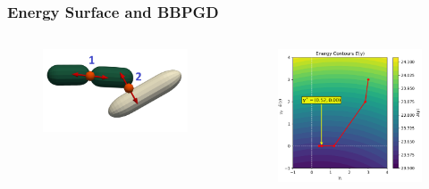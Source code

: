 \documentclass[10pt,t]{beamer}
\begin{document}
\begin{frame}
    \frametitle{Energy Surface and BBPGD}

    \vspace{-0.5cm}
    \begin{columns}[c]
        \begin{column}{0.4\textwidth}
            \begin{figure}
                \centering
                \includegraphics[width=1\textwidth]{figures/constraints_example_small.jpeg}
            \end{figure}
        \end{column}

        \begin{column}{0.65\textwidth}
            \begin{figure}
                \centering
                \includegraphics[width=1\textwidth]{figures/energy_surface_contours.png}
            \end{figure}
        \end{column}
    \end{columns}

\end{frame}
\end{document}
